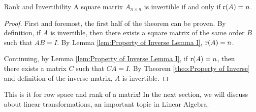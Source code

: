 \documentclass[../../main.tex]{subfiles}
\begin{document}
\begin{theorem}{}{Rank and Invertibility}
A square matrix $A_{n \times n}$ is invertible if and only if
$\operatorname{r}(A) = n$.
\end{theorem}
\begin{proof}
First and foremost, the first half of the theorem can be proven.
By definition, if $A$ is invertible, then there exists a square matrix
of the same order $B$ such that $AB = I$. By Lemma \ref{lem:Property
of Inverse Lemma I}, $\operatorname{r}(A) = n$.

Continuing, by Lemma \ref{lem:Property of Inverse Lemma I}, if
$\operatorname{r}(A) = n$, then there exists a matrix $C$ such that $CA = I$.
By Theorem \ref{theo:Property of Inverse} and definition of the
inverse matrix, $A$ is invertible.
\end{proof}

This is it for row space and rank of a matrix! In the next section,
we will discuss about linear transformations, an important topic in
Linear Algebra.
\end{document}
